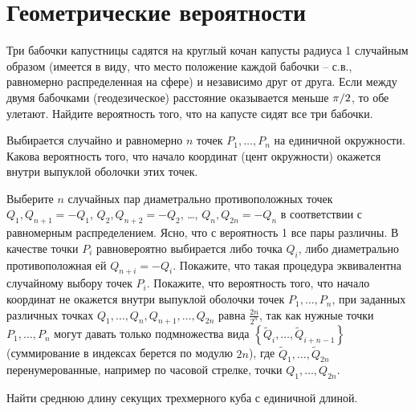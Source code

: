 \section{Геометрические вероятности}
\label{geom}

\begin{problem}

Три бабочки капустницы садятся на круглый кочан капусты радиуса 1 случайным образом (имеется в виду, что место положение каждой бабочки -- с.в., равномерно распределенная на сфере) и независимо друг от друга. Если между двумя бабочками (геодезическое) расстояние оказывается меньше ${\pi \mathord{\left/ {\vphantom {\pi  2}} \right. \kern-\nulldelimiterspace} 2} $, то обе улетают. Найдите вероятность того, что на капусте сидят все три бабочки.

\end{problem}

\begin{problem}

Выбирается случайно и равномерно $n$ точек $P_{1} ,\ldots ,P_{n} $ на единичной окружности. Какова вероятность того, что начало координат (цент окружности) окажется внутри выпуклой оболочки этих точек.

\end{problem}

\begin{ordre} 
Выберите $n$ случайных пар диаметрально противоположных точек $Q_{1} ,Q_{n+1} =-Q_{1} $, $Q_{2} ,Q_{n+2} =-Q_{2} $, \dots , $Q_{n} ,Q_{2n} =-Q_{n} $ в соответствии с равномерным распределением. Ясно, что с вероятность 1 все пары различны. В качестве точки $P_{i} $ равновероятно выбирается либо точка $Q_{i} $, либо диаметрально противоположная ей $Q_{n+i} =-Q_{i} $. Покажите, что такая процедура эквивалентна случайному выбору точек $P_{i} $. Покажите, что вероятность того, что начало координат не окажется внутри выпуклой оболочки точек $P_{1} ,\ldots ,P_{n} $, при заданных различных точках $Q_{1} ,\ldots ,Q_{n} ,Q_{n+1} ,\ldots ,Q_{2n} $ равна $\frac{2n}{2^{n} } $, так как нужные точки $P_{1} ,\ldots ,P_{n} $ могут давать только подмножества вида $\left\{\tilde{Q}_{i} ,\ldots ,\tilde{Q}_{i+n-1} \right\}$(суммирование в индексах берется по модулю $2n$), где $\tilde{Q}_{1} ,\ldots ,\tilde{Q}_{2n} $ перенумерованные, например по часовой стрелке, точки $Q_{1} ,\ldots ,Q_{2n} $.
\end{ordre}

\begin{problem}
Найти среднюю длину секущих трехмерного куба с единичной длиной.
\end{problem}

